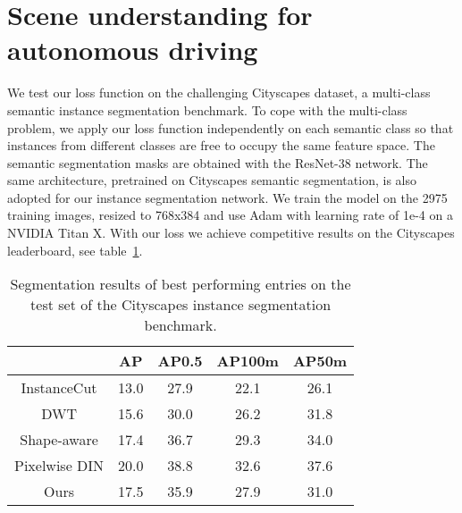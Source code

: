 \documentclass{article}
\begin{document}
\section{Scene understanding for autonomous driving}
We test our loss function on the challenging Cityscapes dataset, a multi-class semantic instance segmentation benchmark. To cope with the multi-class problem, we apply our loss function independently on each semantic class so that instances from different classes are free to occupy the same feature space. The semantic segmentation masks are obtained
with the ResNet-38 network. The same architecture, pretrained on Cityscapes semantic segmentation, is also adopted for our instance segmentation network. We train the model on the 2975 training images, resized to 768x384 and use Adam with learning rate of 1e-4 on a NVIDIA Titan X. With our loss we achieve competitive results on the Cityscapes leaderboard, see table~\ref{Tab:experiment}.\par
\begin{table}
\centering
\begin{tabular}{ccccc}
 \toprule
               & AP   & AP0.5 & AP100m & AP50m \\
 \midrule
 InstanceCut   & 13.0 & 27.9  & 22.1   & 26.1  \\
         DWT   & 15.6 & 30.0  & 26.2   & 31.8  \\
 Shape-aware   & 17.4 & 36.7  & 29.3   & 34.0  \\
 Pixelwise DIN & 20.0 & 38.8  & 32.6   & 37.6  \\
          Ours & 17.5 & 35.9  & 27.9   & 31.0  \\ 
\bottomrule
\end{tabular}
\caption{Segmentation results of best performing entries on the test set of the Cityscapes instance segmentation benchmark.}
\label{Tab:experiment}
\end{table}
\newpage
 

\end{document}
